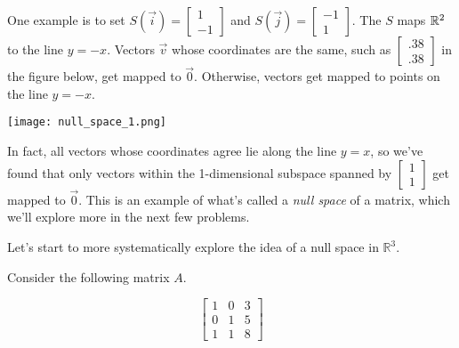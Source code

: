 \documentclass{ximera}
\begin{document}
\begin{exploration}
\begin{solution}
        One example is to set $S(\vec{i})=\begin{bmatrix} 1 \\ -1 \end{bmatrix}$ and $S(\vec{j})=\begin{bmatrix} -1 \\ 1 \end{bmatrix}$. The $S$ maps $\mathbb{R}^2$ to the line $y=-x$. Vectors $\vec{v}$ whose coordinates are the same, such as $\begin{bmatrix} .38 \\ .38 \end{bmatrix}$ in the figure below, get mapped to $\vec{0}$. Otherwise, vectors get mapped to points on the line $y=-x$. 

        \begin{center}
            \texttt{[image: null\_space\_1.png]}
        \end{center}
    
        In fact, all vectors whose coordinates agree lie along the line $y=x$, so we've found that only vectors within the 1-dimensional subspace spanned by $\begin{bmatrix} 1 \\ 1 \end{bmatrix}$ get mapped to $\vec{0}$. This is an example of what's called a \emph{null space} of a matrix, which we'll explore more in the next few problems.

    \end{solution}

\end{exploration}


Let's start to more systematically explore the idea of a null space in $\mathbb{R}^3$.

Consider the following matrix $A$. 

$$ 
\left[
\begin{matrix}
    1 & 0 & 3  \\
    0 & 1 & 5  \\
    1 & 1 & 8 
\end{matrix}
\right] 
$$
\end{document}

